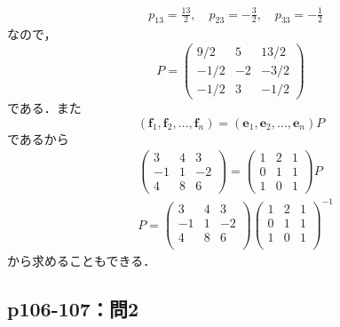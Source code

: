 \documentclass[uplatex,dvipdfmx,a4paper,11pt,fleqn]{jsarticle}
\begin{document}
\begin{leftbar}
\begin{align*}
&p_{13}=\frac{13}{2},\quad p_{23}=-\frac{3}{2},\quad p_{33}=-\frac{1}{2}
\end{align*} 
なので，
\[
P=
\begin{pmatrix}
9/2 & 5  & 13/2 \\
-1/2 & -2 & -3/2 \\
-1/2 & 3 & -1/2
\end{pmatrix}
\]
である．また
\begin{equation*}
(\bm{f}_1,\bm{f}_2,\ldots ,\bm{f}_n)=(\bm{e}_1,\bm{e}_2,\ldots ,\bm{e}_n)P
\end{equation*}
であるから
\begin{align*}
    &
\begin{pmatrix}
3 & 4 & 3 \\
-1 & 1 & -2 \\
4 & 8 & 6 
\end{pmatrix}
=
\begin{pmatrix}
1 & 2 & 1 \\
0 & 1 & 1 \\
1 & 0 & 1 
\end{pmatrix}
P \\ 
&P=
\begin{pmatrix}
3 & 4 & 3 \\
-1 & 1 & -2 \\
4 & 8 & 6 \\
\end{pmatrix}
\begin{pmatrix}
1 & 2 & 1 \\
0 & 1 & 1 \\
1 & 0 & 1 \\
\end{pmatrix}
^{-1}
\end{align*}
から求めることもできる．
\end{leftbar}

\newpage 

\subsection*{p106-107：問2}
\end{document}
